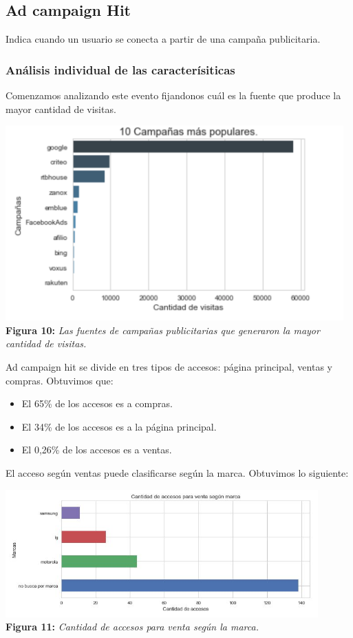 \documentclass[titlepage,a4paper]{article}
\begin{document}
	\subsection{Ad campaign Hit}
	Indica cuando un usuario se conecta a partir de una campaña publicitaria.
	\subsubsection{Análisis individual de las caracterísiticas}
	Comenzamos analizando este evento fijandonos cuál es la fuente que produce la mayor cantidad de visitas.
	\begin{center}
	\includegraphics[width=13cm] {10campaniasmasPopulares.jpg}\\
	\textbf{Figura 10:}  \textit{Las fuentes de campañas publicitarias que generaron la mayor cantidad de visitas.  }
	\end{center}
	Ad campaign hit se divide en tres tipos de accesos: página principal, ventas y compras. Obtuvimos que: 
	\begin{itemize}
	\item El 65\% de los accesos es a compras.
	\item El 34\% de los accesos es a la página principal.
	\item El 0,26\% de los accesos es a ventas. 
	\end{itemize}
	El acceso según ventas puede clasificarse según la marca. Obtuvimos lo siguiente: 
	\begin{center}
	\includegraphics[width=12cm] {cantidadDeAccesosPorMarca.jpg}\\
	\textbf{Figura 11:}  \textit{Cantidad de accesos para venta según la marca.}
	\end{center}
\end{document}
